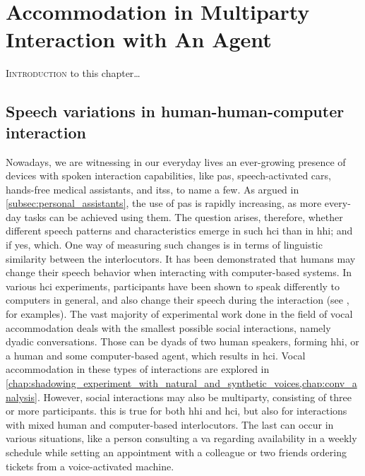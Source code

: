 \chapter{Accommodation in Multiparty Interaction with An Agent}
\label{chap:speech_variations_in_hhci}

\lettrine{I}{introduction} to this chapter\ldots

\pagebreak

\section{Speech variations in human-human-computer interaction}
\label{sec:accommodation_in_multiparty_interaction_with_an_agent}

Nowadays, we are witnessing in our everyday lives an ever-growing presence of devices with spoken interaction capabilities, like \acp{pa}, speech-activated cars, hands-free medical assistants, and \acp{its}, to name a few.
As argued in \cref{subsec:personal_assistants}, the use of \acp{pa} is rapidly increasing, as more every-day tasks can be achieved using them.
The question arises, therefore, whether different speech patterns and characteristics emerge in such \ac{hci} than in \ac{hhi}; and if yes, which.
One way of measuring such changes is in terms of linguistic similarity between the interlocutors.
It has been demonstrated that humans may change their speech behavior when interacting with computer-based systems.
In various \ac{hci} experiments, participants have been shown to speak differently to computers in general, and also change their speech during the interaction (see \citet{Branigan2010linguistic}, for examples).
The vast majority of experimental work done in the field of vocal accommodation deals with the smallest possible social interactions, namely dyadic conversations.
Those can be dyads of two human speakers, forming \ac{hhi}, or a human and some computer-based agent, which results in \ac{hci}.
Vocal accommodation in these types of interactions are explored in \cref{chap:shadowing_experiment_with_natural_and_synthetic_voices,chap:conv_analysis}.
However, social interactions may also be multiparty, consisting of three or more participants.
this is true for both \ac{hhi} and \ac{hci}, but also for interactions with mixed human and computer-based interlocutors.
The last can occur in various situations, like a person consulting a \ac{va} regarding availability in a weekly schedule while setting an appointment with a colleague or two friends ordering tickets from a voice-activated machine.
